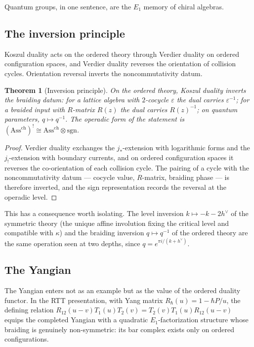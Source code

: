 \documentclass[11pt]{amsart}
\numberwithin{equation}{section}
\theoremstyle{plain}
\newtheorem{theorem}{Theorem}[section]
\theoremstyle{definition}
\theoremstyle{remark}
\newcommand{\dvee}{h^{\vee}}
\begin{document}
Quantum groups, in one sentence, are the $E_1$ memory of chiral algebras.

\subsection{The inversion principle}

Koszul duality acts on the ordered theory through Verdier duality on
ordered configuration spaces, and Verdier duality reverses the orientation
of collision cycles. Orientation reversal inverts the noncommutativity
datum.

\begin{theorem}[Inversion principle]\label{thm:inversion-principle}
On the ordered theory, Koszul duality inverts the braiding datum: for a
lattice algebra with $2$-cocycle $\varepsilon$ the dual carries
$\varepsilon^{-1}$; for a braided input with $R$-matrix $R(z)$ the dual
carries $R(z)^{-1}$; on quantum parameters, $q\mapsto q^{-1}$. The
operadic form of the statement is
$(\mathrm{Ass}^{\mathrm{ch}})^{!}\cong\mathrm{Ass}^{\mathrm{ch}}
\otimes\mathrm{sgn}$.
\end{theorem}

\begin{proof}
Verdier duality exchanges the $j_{*}$-extension with logarithmic
forms and the $j_{!}$-extension with boundary currents, and on
ordered configuration spaces it reverses the co-orientation of each
collision cycle. The pairing of a cycle with the noncommutativity
datum --- cocycle value, $R$-matrix, braiding phase --- is therefore
inverted, and the sign representation records the reversal at the
operadic level.
\end{proof}

This has a consequence worth isolating. The level inversion
$k\mapsto-k-2\dvee$ of the symmetric theory (the unique affine involution
fixing the critical level and compatible with $\kappa$) and the braiding
inversion $q\mapsto q^{-1}$ of the ordered theory are the same operation
seen at two depths, since $q=e^{\pi i/(k+\dvee)}$.

\subsection{The Yangian}

The Yangian enters not as an example but as the value of the ordered
duality functor. In the RTT presentation, with Yang matrix
$R_{\hbar}(u)=1-\hbar P/u$, the defining relation
$R_{12}(u{-}v)T_1(u)T_2(v)=T_2(v)T_1(u)R_{12}(u{-}v)$ equips the completed
Yangian with a quadratic $E_1$-factorization structure whose braiding is
genuinely non-symmetric: its bar complex exists only on ordered
configurations.
\end{document}
